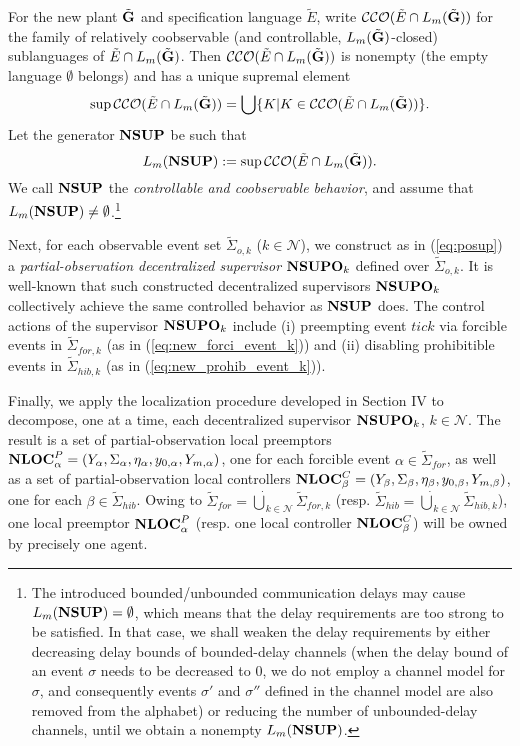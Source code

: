 For the new plant $\tilde{\bf{G}}$ and specification language $\tilde{E}$,
write $\mathcal{CCO}(\tilde{E} \cap L_m(\tilde{\bf{G}}))$ for the
family of relatively coobservable (and controllable, $L_m(\tilde{\bf
G})$-closed) sublanguages of $\tilde{E} \cap L_m(\tilde{\bf{G}})$.
Then $\mathcal{CCO}(\tilde{E} \cap L_m(\tilde{\bf{G}}))$ is nonempty
(the empty language $\emptyset$ belongs) and has a unique
supremal element
\[\sup\mathcal{CCO}(\tilde{E} \cap L_m(\tilde{\bf{G}})) = \bigcup\{K|K\in\mathcal{CCO}(\tilde{E} \cap L_m(\tilde{\bf{G}}))\}.\]
Let the generator ${\bf NSUP}$ be such that
\begin{equation} \label{eq:new_monosup}
L_m({\bf NSUP}) := \sup \mathcal {CCO}(\tilde{E} \cap L_m(\tilde{\bf{G}})).
\end{equation}
We call ${\bf NSUP}$ the {\it controllable and coobservable
behavior}, and assume that $L_m({\bf NSUP}) \neq \emptyset$.\footnote{The introduced
bounded/unbounded communication delays may cause $L_m({\bf NSUP}) = \emptyset$,
which means that the delay requirements are too strong to be satisfied. In that case,
we shall weaken the delay requirements by either decreasing delay bounds of bounded-delay channels
(when the delay bound of an event $\sigma$ needs to be decreased to 0, we do not employ a channel model
for $\sigma$, and consequently events $\sigma'$ and $\sigma''$ defined in the channel model are also removed from the alphabet)
or reducing the number of unbounded-delay channels, until we
obtain a nonempty $L_m({\bf NSUP})$. }

Next, for each observable event set $\tilde\Sigma_{o,k}$ ($k \in \mathcal{N}$),
we construct as in (\ref{eq:posup}) a {\it partial-observation decentralized supervisor}
${\bf NSUPO}_k$ defined over $\tilde\Sigma_{o,k}$. It is well-known \cite{RudWon:1992,LinWon95}
that such constructed decentralized supervisors ${\bf NSUPO}_k$
collectively achieve the same controlled behavior as $\bf NSUP$
does.
The control actions of the supervisor ${\bf NSUPO}_k$
include (i) preempting event $tick$ via forcible events in $\tilde\Sigma_{for,k}$ (as in (\ref{eq:new_forci_event_k}))
and (ii) disabling prohibitible events in $\tilde\Sigma_{hib,k}$ (as in (\ref{eq:new_prohib_event_k})).

Finally, we apply the localization procedure developed in Section IV to decompose,
one at a time, each decentralized supervisor ${\bf NSUPO}_k$, $k \in \mathcal{N}$.
The result is a set of partial-observation local preemptors ${\bf NLOC}_{\alpha}^P = (Y_{\alpha},
\Sigma_{\alpha},\eta_{\alpha}, y_{0,\alpha},Y_{m,\alpha})$, one for each forcible
event $\alpha \in \tilde\Sigma_{for}$, as well as a set of partial-observation local controllers ${\bf NLOC}_{\beta}^C = (Y_{\beta},
\Sigma_{\beta},\eta_{\beta}, y_{0,\beta},Y_{m,\beta})$, one for each $\beta \in \tilde\Sigma_{hib}$.
Owing to $\tilde\Sigma_{for} = \dot{\bigcup}_{k \in \mathcal{N}} \tilde\Sigma_{for,k}$
(resp. $\tilde\Sigma_{hib} = \dot{\bigcup}_{k \in \mathcal{N}} \tilde\Sigma_{hib,k}$),
one local preemptor ${\bf NLOC}_{\alpha}^P$ (resp. one local controller ${\bf NLOC}_{\beta}^C$)
will be owned by precisely one agent.

